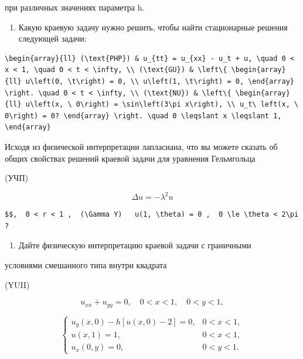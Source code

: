 \documentclass[
  ukrainian,
]{article}
\providecommand{\tightlist}{%
  \setlength{\itemsep}{0pt}\setlength{\parskip}{0pt}}
\begin{document}
при различных значениях параметра h.

\begin{enumerate}
\def\labelenumi{\arabic{enumi}.}
\setcounter{enumi}{3}
\tightlist
\item
  Какую краевую задачу нужно решить, чтобы найти стационарные решения
  следующей задачи:
\end{enumerate}

\begin{verbatim}
\begin{array}{ll} (\text{PHP}) & u_{tt} = u_{xx} - u_t + u, \quad 0 < x < 1, \quad 0 < t < \infty, \\ (\text{GU}) & \left\{ \begin{array}{ll} u\left(0, \t\right) = 0, \\ u\left(1, \t\right) = 0, \end{array} \right. \quad 0 < t < \infty, \\ (\text{NU}) & \left\{ \begin{array}{ll} u\left(x, \ 0\right) = \sin\left(3\pi x\right), \\ u_t\ left(x, \ 0\right) = 0? \end{array} \right. \quad 0 \leqslant x \leqslant 1, \end{array}
\end{verbatim}

Исходя из физической интерпретации лапласиана, что вы можете сказать об
общих свойствах решений краевой задачи для уравнения Гельмгольца

(УЧП)

\[
\Delta u = -\lambda^2 u
\]

\begin{verbatim}
$$,  0 < r < 1 ,  (\Gamma Y)   u(1, \theta) = 0 ,  0 \le \theta < 2\pi ?
\end{verbatim}

\begin{enumerate}
\def\labelenumi{\arabic{enumi}.}
\setcounter{enumi}{5}
\tightlist
\item
  Дайте физическую интерпретацию краевой задачи с граничными
\end{enumerate}

условиями смешанного типа внутри квадрата

(YUII)

\[
u_{xx} + u_{yy} = 0, \quad 0 < x < 1, \quad 0 < y < 1,
\]

\[
\begin{cases} u_y(x, 0) - h[u(x, 0) - 2] = 0, & 0 < x < 1, \\ u(x, 1) = 1, & 0 < x < 1, \\ u_x(0, y) = 0, & 0 < y < 1. \end{cases}
\]
\end{document}
